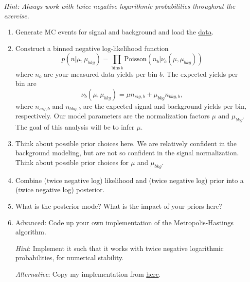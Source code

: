 \documentclass{article}
\begin{document}
\textit{Hint: Always work with twice negative logarithmic probabilities throughout the exercise.}
\begin{enumerate}
    \item Generate MC events for signal and background and load the \href{https://github.com/lorenzennio/icsc-bayesian-inference/blob/main/LHC_data.txt}{data}. %

    \item Construct a binned negative log-likelihood function
    $$p(n|\mu, \mu_{bkg}) = \prod_{\mathrm{bins}~b} \mathrm{Poisson}(n_b|\nu_b(\mu, \mu_{bkg}))$$
    where $n_b$ are your measured data yields per bin $b$. The expected yields per bin are
    $$\nu_b(\mu, \mu_{bkg}) = \mu n_{sig,b} + \mu_{bkg} n_{bkg, b},$$
    where $n_{sig,b}$ and $n_{bkg,b}$ are the expected signal and background yields per bin, respectively. Our model parameters are the normalization factors $\mu$ and $\mu_{bkg}$. The goal of this analysis will be to infer $\mu$.

    \item Think about possible prior choices here. We are relatively confident in the background modeling, but are not so confident in the signal normalization. Think about possible prior choices for $\mu$ and $\mu_{bkg}$.

    \item Combine (twice negative log) likelihood and (twice negative log) prior into a (twice negative log) posterior.

    \item What is the posterior mode? What is the impact of your priors here?


    \item {Advanced}: Code up your own implementation of the Metropolis-Hastings algorithm.

    \textit{Hint}: Implement it such that it works with twice negative logarithmic probabilities, for numerical stability.

    \textit{Alternative}: Copy my implementation from \href{https://github.com/lorenzennio/icsc-bayesian-inference/blob/main/mcmc.py}{here}.


\end{enumerate}
\end{document}
